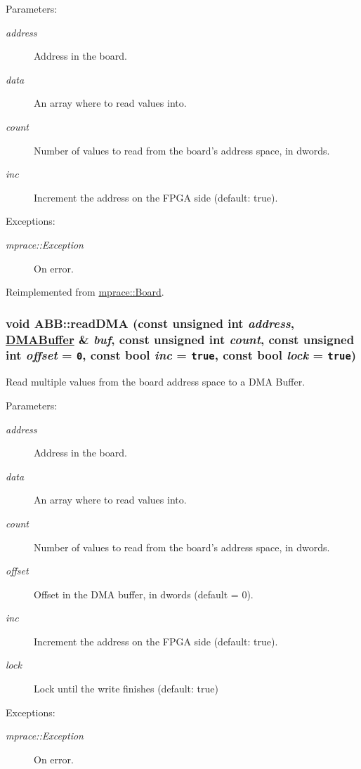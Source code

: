 \begin{Desc}
\item[Parameters:]
\begin{description}
\item[{\em address}]Address in the board. \item[{\em data}]An array where to read values into. \item[{\em count}]Number of values to read from the board's address space, in dwords. \item[{\em inc}]Increment the address on the FPGA side (default: true). \end{description}
\end{Desc}
\begin{Desc}
\item[Exceptions:]
\begin{description}
\item[{\em mprace::Exception}]On error.\end{description}
\end{Desc}


Reimplemented from \hyperlink{classmprace_1_1Board_a6}{mprace::Board}.\hypertarget{classmprace_1_1ABB_a9}{
\subsubsection[readDMA]{\setlength{\rightskip}{0pt plus 5cm}void ABB::read\-DMA (const unsigned int {\em address}, \hyperlink{classmprace_1_1DMABuffer}{DMABuffer} \& {\em buf}, const unsigned int {\em count}, const unsigned int {\em offset} = {\tt 0}, const bool {\em inc} = {\tt true}, const bool {\em lock} = {\tt true})}}
\label{classmprace_1_1ABB_a9}


Read multiple values from the board address space to a DMA Buffer. 

\begin{Desc}
\item[Parameters:]
\begin{description}
\item[{\em address}]Address in the board. \item[{\em data}]An array where to read values into. \item[{\em count}]Number of values to read from the board's address space, in dwords. \item[{\em offset}]Offset in the DMA buffer, in dwords (default = 0). \item[{\em inc}]Increment the address on the FPGA side (default: true). \item[{\em lock}]Lock until the write finishes (default: true) \end{description}
\end{Desc}
\begin{Desc}
\item[Exceptions:]
\begin{description}
\item[{\em mprace::Exception}]On error.\end{description}
\end{Desc}


